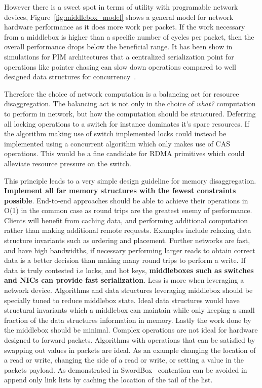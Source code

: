 However there is a sweet spot in terms of utility with programable network
devices, Figure~\ref{fig:middlebox_model} shows a general model for network hardware
performance as it does more work per packet. If the work necessary from a
middlebox is higher than a specific number of cycles per packet, then the
overall performance drops below the beneficial range. It has been show in
simulations for PIM architectures that a centralized serialization point for
operations like pointer chasing can slow down operations compared to well
designed data structures for concurrency~.

Therefore the choice of network computation is a balancing act for resource
disaggregation. The balancing act is not only in the choice of \textit{what?}
computation to perform in network, but how the computation should be structured.
Deferring all locking operations to a switch for instance dominates it's spare
resources. If the algorithm making use of switch implemented locks could instead
be implemented using a concurrent algorithm which only makes use of CAS
operations. This would be a fine candidate for RDMA primitives which could
alleviate resource pressure on the switch.

This principle leads to a very simple design guideline for memory
disaggregation. \textbf{Implement all far memory structures with the fewest
constraints possible}. End-to-end approaches should be able to achieve their
operations in O(1) in the common case as round trips are the greatest enemy of
performance.  Clients will benefit from caching data, and performing additional
computation rather than making additional remote requests. Examples include
relaxing data structure invariants such as ordering and placement. Further
networks are fast, and have high bandwidths, if necessary performing larger
reads to obtain correct data is a better decision than making many round trips
to perform a write. If data is truly contested i.e locks, and hot keys,
\textbf{middleboxes such as switches and NICs can provide fast serialization}.
Less is more when leveraging a network device. Algorithms and data structures
leveraging middlebox should be specially tuned to reduce middlebox state. Ideal
data structures would have structural invariants which a middlebox can maintain
while only keeping a small fraction of the data structures information in
memory. Lastly the work done by the middlebox should be minimal. Complex
operations are not ideal for hardware designed to forward packets. Algorithms
with operations that can be satisfied by swapping out values in packets are
ideal. As an example changing the location of a read or write, changing the side
of a read or write, or setting a value in the packets payload. As demonstrated
in SwordBox~\cite{Grant2021InContRes} contention can be avoided in append only
link lists by caching the location of the tail of the list.


